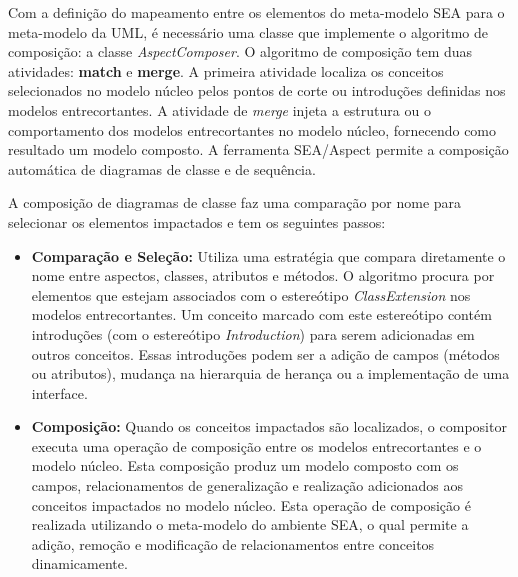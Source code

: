Com a definição do mapeamento entre os elementos do meta-modelo SEA para o meta-modelo da UML, é necessário uma classe que implemente o algoritmo de
composição: a classe \textit{AspectComposer}. O algoritmo de composição tem duas atividades: \textbf{match} e \textbf{merge}. A primeira atividade
localiza os conceitos selecionados no modelo núcleo pelos pontos de corte ou introduções definidas nos modelos entrecortantes. A atividade de \textit{merge} 
injeta a estrutura ou o comportamento dos modelos entrecortantes no modelo núcleo, fornecendo como resultado um modelo composto. A ferramenta
SEA/Aspect permite a composição automática de diagramas de classe e de sequência.

A composição de diagramas de classe faz uma comparação por nome para selecionar os elementos impactados e tem os seguintes passos:
  
\begin{itemize}
  
	\item \textbf{Comparação e Seleção:} Utiliza uma estratégia que compara diretamente o nome entre aspectos, classes, atributos e métodos. O algoritmo
	procura por elementos que estejam associados com o estereótipo \textit{ClassExtension} nos modelos entrecortantes. Um conceito marcado com este
	estereótipo contém introduções (com o estereótipo \textit{Introduction}) para serem adicionadas em outros conceitos. Essas introduções podem ser a
	adição de campos (métodos ou atributos), mudança na hierarquia de herança ou a implementação de uma interface. 
	
	\item \textbf{Composição:} Quando os conceitos impactados são localizados, o compositor executa uma operação de composição entre os modelos
	entrecortantes e o modelo núcleo. Esta composição produz um modelo composto com os campos, relacionamentos de generalização e realização
	adicionados aos conceitos impactados no modelo núcleo. Esta operação de composição é realizada utilizando o meta-modelo do ambiente SEA, o qual
	permite a adição, remoção e modificação de relacionamentos entre conceitos dinamicamente.

\end{itemize}

